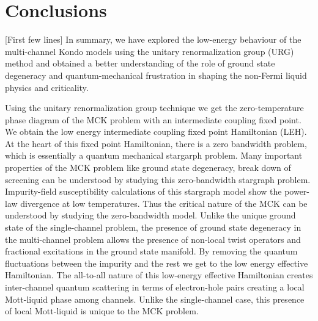 \documentclass[reprint,prb,superscriptaddress]{revtex4-2}
\begin{document}
\section{Conclusions}
[First few lines] 
{\color{blue} In summary, we have explored the low-energy behaviour of the multi-channel Kondo models using the unitary renormalization group (URG) method and obtained a better understanding of the role of ground state degeneracy and quantum-mechanical frustration in shaping the non-Fermi liquid physics and criticality.}

\par Using the unitary renormalization group technique we get the zero-temperature phase diagram of the MCK problem with an intermediate coupling fixed point. We obtain the low energy intermediate coupling fixed point Hamiltonian (LEH).  At the heart of this fixed point Hamiltonian, there is a zero bandwidth problem, which is essentially a quantum mechanical stargarph problem. Many important properties of the MCK problem like ground state degeneracy, break down of screening can be understood by studying this zero-bandwidth stargraph problem. Impurity-field susceptibility calculations of this stargraph model show the power-law divergence at low temperatures. Thus the critical nature of the MCK can be understood by studying the zero-bandwidth model. Unlike the unique ground state of the single-channel problem, the presence of ground state degeneracy in the multi-channel problem allows the presence of non-local twist operators and fractional excitations in the ground state manifold. By removing the quantum fluctuations between the impurity and the rest we get to the low energy effective Hamiltonian. The all-to-all nature of this low-energy effective Hamiltonian creates inter-channel quantum scattering in terms of electron-hole pairs creating a local Mott-liquid phase among channels. Unlike the single-channel case, this presence of local Mott-liquid is unique to the MCK problem.
\end{document}
